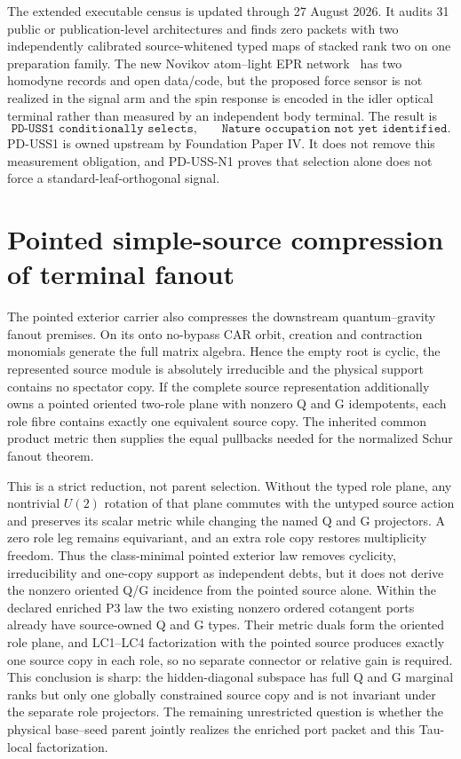\documentclass[11pt]{article}
\begin{document}
The extended executable census is updated through 27 August 2026. It audits
31 public or publication-level architectures and finds zero packets with two
independently calibrated source-whitened typed maps of stacked rank two on one
preparation family. The new Novikov atom--light EPR network~\cite{Novikov2025} has two homodyne
records and open data/code, but the proposed force sensor is not realized in
the signal arm and the spin response is encoded in the idler optical terminal
rather than measured by an independent body terminal. The result is
\[
 \texttt{PD-USS1 conditionally selects,}\qquad
 \texttt{Nature occupation not yet identified.}
\]
PD-USS1 is owned upstream by Foundation Paper IV. It does not remove this
measurement obligation, and PD-USS-N1 proves that selection alone does not
force a standard-leaf-orthogonal signal.

\section{Pointed simple-source compression of terminal fanout}

The pointed exterior carrier also compresses the downstream quantum--gravity
fanout premises.  On its onto no-bypass CAR orbit, creation and contraction
monomials generate the full matrix algebra.  Hence the empty root is cyclic,
the represented source module is absolutely irreducible and the physical
support contains no spectator copy.  If the complete source representation
additionally owns a pointed oriented two-role plane with nonzero Q and G
idempotents, each role fibre contains exactly one equivalent source copy.
The inherited common product metric then supplies the equal pullbacks needed
for the normalized Schur fanout theorem.

This is a strict reduction, not parent selection.  Without the typed role
plane, any nontrivial $U(2)$ rotation of that plane commutes with the untyped
source action and preserves its scalar metric while changing the named Q and
G projectors.  A zero role leg remains equivariant, and an extra role copy
restores multiplicity freedom.  Thus the class-minimal pointed exterior law
removes cyclicity, irreducibility and one-copy support as independent debts,
but it does not derive the nonzero oriented Q/G incidence from the pointed
source alone.  Within the declared enriched P3 law the two existing nonzero
ordered cotangent ports already have source-owned Q and G types.  Their
metric duals form the oriented role plane, and LC1--LC4 factorization with the
pointed source produces exactly one source copy in each role, so no separate
connector or relative gain is required.  This conclusion is sharp: the
hidden-diagonal subspace has full Q and G marginal ranks but only one globally
constrained source copy and is not invariant under the separate role
projectors.  The remaining unrestricted question is whether the physical
base--seed parent jointly realizes the enriched port packet and this
Tau-local factorization.
\end{document}
